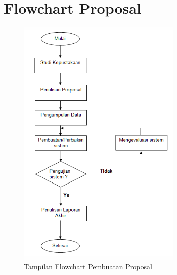 \documentclass{jtetiproposalskripsi}
\begin{document}
\section{Flowchart Proposal}
\begin{figure}[h]
\centering 
 \includegraphics[width=0.7\textwidth]{gambar/1}  
 \caption{Tampilan Flowchart Pembuatan Proposal}
\end{figure}
\newpage
\end{document}
